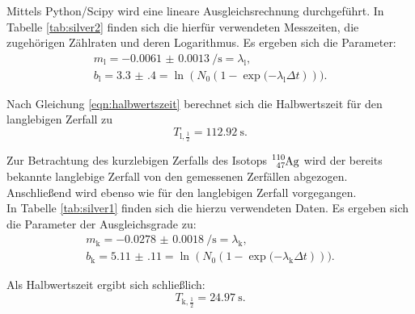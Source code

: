 Mittels Python/Scipy \cite{scipy} wird eine lineare Ausgleichsrechnung durchgeführt.
In Tabelle \ref{tab:silver2} finden sich die hierfür verwendeten Messzeiten, die zugehörigen Zählraten und deren Logarithmus.
Es ergeben sich die Parameter:
\begin{gather*}
	m_{\mathrm{l}}= \SI{-0.0061(13)}{\per\second}=\lambda_\mathrm{l}\text{,}\\
	b_{\mathrm{l}}=\num{3.3(4)}=\ln{(N_0 \left(1- \exp{(-\lambda_\mathrm{l} \Delta t}\right)))}\text{.}
\end{gather*}

Nach Gleichung \eqref{eqn:halbwertszeit} berechnet sich die Halbwertszeit für den langlebigen Zerfall zu
\begin{equation}
	T_{\mathrm{l},\frac{1}{2}}=\SI{112.92}{\second}\text{.}
\end{equation}


Zur Betrachtung des kurzlebigen Zerfalls des Isotops $\ce{^{110}_47Ag}$ wird der bereits bekannte langlebige Zerfall von den gemessenen Zerfällen abgezogen.
Anschließend wird ebenso wie für den langlebigen Zerfall vorgegangen.\\
In Tabelle \ref{tab:silver1} finden sich die hierzu verwendeten Daten.
Es ergeben sich die Parameter der Ausgleichsgrade zu:
\begin{align*}
	m_{\mathrm{k}}= \SI{-0.0278(18)}{\per\second}=\lambda_\mathrm{k}\text{,}\\
	b_{\mathrm{k}}=\num{5.11(11)}=\ln{(N_0 \left(1- \exp{(-\lambda_\mathrm{k} \Delta t}\right)))}\text{.}
\end{align*}

Als Halbwertszeit ergibt sich schließlich:
\begin{equation}
	T_{\mathrm{k},\frac{1}{2}}=\SI{24.97}{\second}\text{.}
\end{equation}

